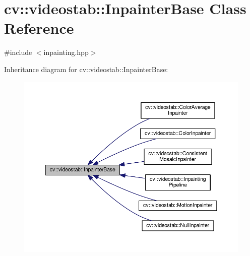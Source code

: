 \hypertarget{classcv_1_1videostab_1_1InpainterBase}{\section{cv\-:\-:videostab\-:\-:Inpainter\-Base Class Reference}
\label{classcv_1_1videostab_1_1InpainterBase}
}


{\ttfamily \#include $<$inpainting.\-hpp$>$}



Inheritance diagram for cv\-:\-:videostab\-:\-:Inpainter\-Base\-:\nopagebreak
\begin{figure}[H]
\begin{center}
\leavevmode
\includegraphics[width=350pt]{classcv_1_1videostab_1_1InpainterBase__inherit__graph}
\end{center}
\end{figure}
